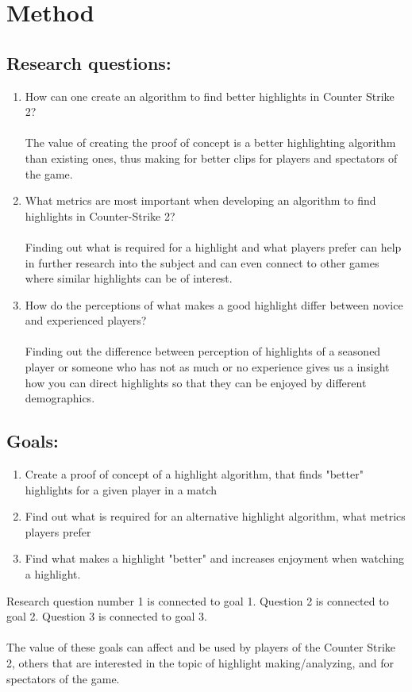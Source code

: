 
\chapter{Method}
\label{chp:method}
\section{Research questions:}
\normalsize
\begin{enumerate}[label=RQ\arabic*., leftmargin=*]
    \item How can one create an algorithm to find better highlights in Counter Strike 2? \\\\
    The value of creating the proof of concept is a better highlighting algorithm than existing ones, thus making for better clips for players and spectators of the game. 
    \item What metrics are most important when developing an algorithm to find highlights in Counter-Strike 2? \\\\
    Finding out what is required for a highlight and what players prefer can help in further research into the subject and can even connect to other games where similar highlights can be of interest.
    \item How do the perceptions of what makes a good highlight differ between novice and experienced players?\\\\
    Finding out the difference between perception of highlights of a seasoned player or someone who has not as much or no experience gives us a insight how you can direct highlights so that they can be enjoyed by different demographics. 
\end{enumerate}
\section{Goals:}
\normalsize
\begin{enumerate}[label=PG\arabic*., leftmargin=*]
    \item Create a proof of concept of a highlight algorithm, that finds "better" highlights for a given player in a match
    \item Find out what is required for an alternative highlight algorithm, what metrics players prefer
    \item Find what makes a highlight "better" and increases enjoyment when watching a highlight.

\end{enumerate}
Research question number 1 is connected to goal 1. Question 2 is connected to goal 2. Question 3 is connected to goal 3.\\\\
The value of these goals can affect and be used by players of the Counter Strike 2, others that are interested in the topic of highlight making/analyzing, and for spectators of the game.\\\\

